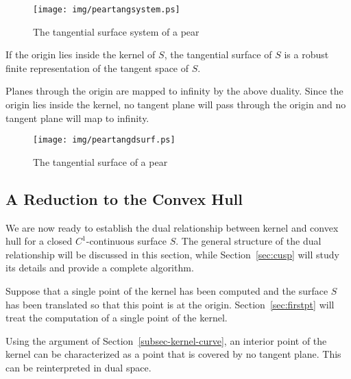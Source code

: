 \documentclass{elsart}
\begin{document}
\begin{figure}[h]
\begin{center}
\texttt{[image: img/peartangsystem.ps]}
\end{center}
\caption{The tangential surface system of a pear}
\label{fig:peartangsystem}
\vskip 0.2in
\end{figure}

\begin{lemma}
\label{lem:drobust}
If the origin lies inside the kernel of $S$,
the tangential surface of $S$ is a robust finite representation of
the tangent space of $S$.
\end{lemma}
\prf
Planes through the origin are mapped to infinity by the above duality.
Since the origin lies inside the kernel,
no tangent plane will pass through the origin and no tangent plane will map to infinity.
\QED

\begin{figure}
\begin{center}
\texttt{[image: img/peartangdsurf.ps]}
\end{center}
\caption{The tangential surface of a pear}
\label{fig:peartangdsurf}
\vskip 0.2in
\end{figure}


\subsection{A Reduction to the Convex Hull}
\label{sec:reduction}

We are now ready to establish the dual relationship between kernel and convex hull
for a closed $C^1$-continuous surface $S$.
The general structure of the dual relationship will be discussed in this section,
while Section~\ref{sec:cusp} will study its details and provide a complete algorithm.

Suppose that a single point of the kernel has been computed and the surface $S$
has been translated so that this point is at the origin.
Section~\ref{sec:firstpt} will treat the computation of a single point of the kernel.

Using the argument of Section~\ref{subsec-kernel-curve},
an interior point of the kernel can be characterized as a point that is covered by
no tangent plane.
This can be reinterpreted in dual space.
\end{document}
